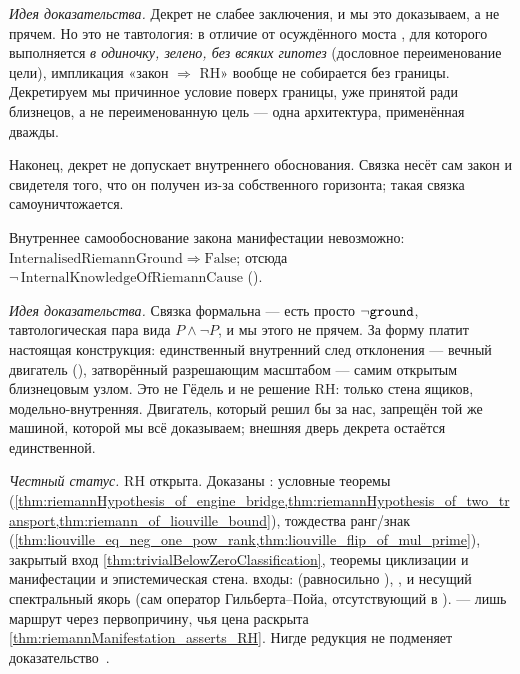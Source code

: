 \emph{Идея доказательства.} Декрет не слабее заключения, и мы это доказываем, а не прячем. Но это не
тавтология: в отличие от осуждённого моста , для которого
 выполняется \emph{в одиночку, зелено, без всяких гипотез} (дословное
переименование цели), импликация «закон $\Rightarrow$ RH» вообще не собирается без границы.
Декретируем мы причинное условие поверх границы, уже принятой ради близнецов, а не переименованную
цель --- одна архитектура, применённая дважды.

Наконец, декрет не допускает внутреннего обоснования. Связка  несёт
сам закон и свидетеля того, что он получен из-за собственного горизонта; такая связка
самоуничтожается.

\begin{theorem}\label{thm:no_internalisedRiemannGround}
Внутреннее самообоснование закона манифестации невозможно:
$\mathrm{InternalisedRiemannGround} \Rightarrow \mathrm{False}$; отсюда
$\neg\,\mathrm{InternalKnowledgeOfRiemannCause}$ (). \green{}
\end{theorem}

\emph{Идея доказательства.} Связка формальна ---  есть просто $\neg\texttt{ground}$,
тавтологическая пара вида $P\wedge\neg P$, и мы этого не прячем. За форму платит настоящая
конструкция: единственный внутренний след отклонения --- вечный двигатель
(), затворённый разрешающим масштабом --- самим
открытым близнецовым узлом. Это не Гёдель и не решение RH: только стена ящиков, модельно-внутренняя.
Двигатель, который решил бы за нас, запрещён той же машиной, которой мы всё доказываем; внешняя дверь
декрета остаётся единственной.

\medskip

\noindent\emph{Честный статус.} RH \red{} открыта. Доказаны \green{}: условные теоремы
(\cref{thm:riemannHypothesis_of_engine_bridge,thm:riemannHypothesis_of_two_transport,thm:riemann_of_liouville_bound}),
тождества ранг/знак
(\cref{thm:liouville_eq_neg_one_pow_rank,thm:liouville_flip_of_mul_prime}), закрытый вход
\cref{thm:trivialBelowZeroClassification}, теоремы циклизации и манифестации и эпистемическая стена.
\red{} входы:  (равносильно ), ,
 и несущий спектральный якорь (сам оператор Гильберта--Пойа, отсутствующий в
). \yellow{} --- лишь маршрут через первопричину, чья цена раскрыта
\cref{thm:riemannManifestation_asserts_RH}. Нигде редукция не подменяет доказательство~\cite{clay-rh}.
